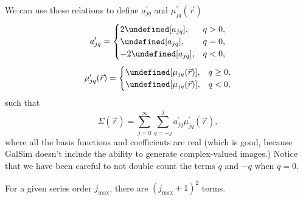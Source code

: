 \documentclass{article}
\let\Re\undefined
\DeclareMathOperator{\Re}{Re}
\let\Im\undefined
\DeclareMathOperator{\Im}{Im}
\begin{document}
We can use these relations to define $a^\prime_{jq}$ and $\mu^\prime_{jq}(\vec{r})$
\[
a^\prime_{jq} =
\begin{cases}
  2 \Re[a_{jq}], & q > 0, \\
  \Re[a_{jq}], & q = 0, \\
  -2 \Im[a_{jq}], & q < 0,
\end{cases}
\]
\[
\mu^\prime_{jq}(\vec{r}) =
\begin{cases}
  \Re[\mu_{jq}(\vec{r})], & q \ge 0, \\
  \Im[\mu_{jq}(\vec{r})], & q < 0,
\end{cases}
\]
such that
\begin{equation}
  \label{eqn:sum_jqprime}
  \Sigma(\vec{r}) = \sum_{j=0}^{\infty}\sum_{q=-j}^{j} a^\prime_{jq}\mu^\prime_{jq}(\vec{r}),
\end{equation}
where all the basis functions and coefficients are real (which is good, because GalSim doesn't include the ability to generate complex-valued images.)
Notice that we have been careful to not double count the terms $q$ and $-q$ when $q=0$.

For a given series order $j_\mathrm{max}$, there are $(j_\mathrm{max}+1)^2$ terms.
\end{document}
